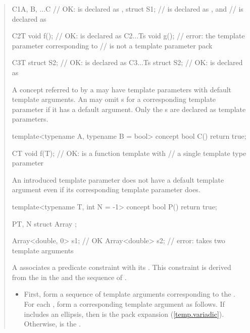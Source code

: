 \begin{quote}
\begin{codeblock}
C1{A, B, ...C} // OK:  is declared as ,
  struct S1;   //  is declared as , and
               //  is declared as 

C2{T} void f();    // OK:  is declared as 
C2{...Ts} void g(); // error: the template parameter corresponding to 
                    // is not a template parameter pack

C3{T} struct S2;     // OK:  is declared as 
C3{...Ts} struct S2; // OK:  is declared as 
\end{codeblock}
\exitexample


\pnum
A concept referred to by a  may have 
template parameters with default template arguments. An 
 may omit s for a 
corresponding template parameter if it has a default argument.
% 
Only the s are declared as template 
parameters.
% 
\enterexample
\begin{codeblock}
template<typename A, typename B = bool> concept bool C() { return true; }

C{T} void f(T); // OK:  is a function template with
                // a single template type parameter 
\end{codeblock}
\exitexample

\pnum
An introduced template parameter does not have a default template argument 
even if its corresponding template parameter does.
% 
\enterexample
\begin{codeblock}
template<typename T, int N = -1> concept bool P() { return true; }

P{T, N} struct Array { };

Array<double, 0> s1; // OK
Array<double> s2;    // error:  takes two template arguments
\end{codeblock}
\exitexample

\pnum
A  associates a predicate constraint with 
its . This constraint is derived from
the   in the 
 and the sequence of 
.

\begin{itemize}
\item First, form a sequence of template arguments  
corresponding to the 
.
% 
For each  , form a corresponding 
template argument  as follows. If  includes an ellipsis,
then  is the pack expansion  (\ref{temp.variadic}). 
Otherwise,  is the  .


\end{itemize}
\end{quote}

